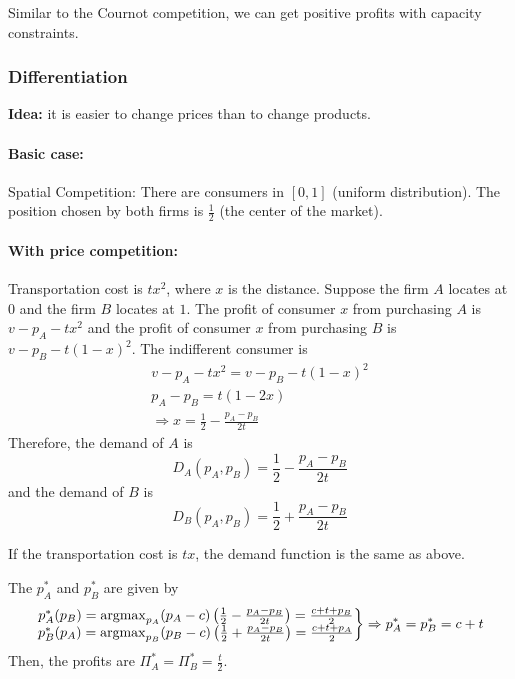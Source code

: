\documentclass[11pt]{elegantbook}
\newcommand{\argmax}{\operatornamewithlimits{argmax}}
\begin{document}
Similar to the Cournot competition, we can get positive profits with capacity constraints.

\subsubsection*{Differentiation}
\textbf{Idea:} it is easier to change prices than to change products.

\paragraph*{Basic case:} Spatial Competition: There are consumers in $[0,1]$ (uniform distribution). The position chosen by both firms is $\frac{1}{2}$ (the center of the market).

\paragraph*{With price competition:} Transportation cost is $t x^2$, where $x$ is the distance. Suppose the firm $A$ locates at $0$ and the firm $B$ locates at $1$. The profit of consumer $x$ from purchasing $A$ is $v-p_A-tx^2$ and the profit of consumer $x$ from purchasing $B$ is $v-p_B-t(1-x)^2$. The indifferent consumer is
\begin{equation}
    \begin{aligned}
        v-p_A-tx^2=v-p_B-t(1-x)^2\\
        p_A-p_B=t(1-2x)\\
        \Rightarrow x=\frac{1}{2}-\frac{p_A-p_B}{2t}
    \end{aligned}
    \nonumber
\end{equation}
Therefore, the demand of $A$ is $$D_A(p_A,p_B)=\frac{1}{2}-\frac{p_A-p_B}{2t}$$ and the demand of $B$ is $$D_B(p_A,p_B)=\frac{1}{2}+\frac{p_A-p_B}{2t}$$
\begin{note}
    If the transportation cost is $tx$, the demand function is the same as above.
\end{note}
The $p_A^*$ and $p_B^*$ are given by
\begin{equation}
    \begin{aligned}
        \left.\begin{matrix}
            p_A^*(p_B)=\argmax_{p_A}(p_A-c)\left(\frac{1}{2}-\frac{p_A-p_B}{2t}\right)=\frac{c+t+p_B}{2}\\
            p_B^*(p_A)=\argmax_{p_B}(p_B-c)\left(\frac{1}{2}+\frac{p_A-p_B}{2t}\right)=\frac{c+t+p_A}{2}
        \end{matrix}\right\} \Rightarrow p_A^*=p_B^*=c+t
    \end{aligned}
    \nonumber
\end{equation}
Then, the profits are $\Pi_A^*=\Pi_B^*=\frac{t}{2}$.
\end{document}
